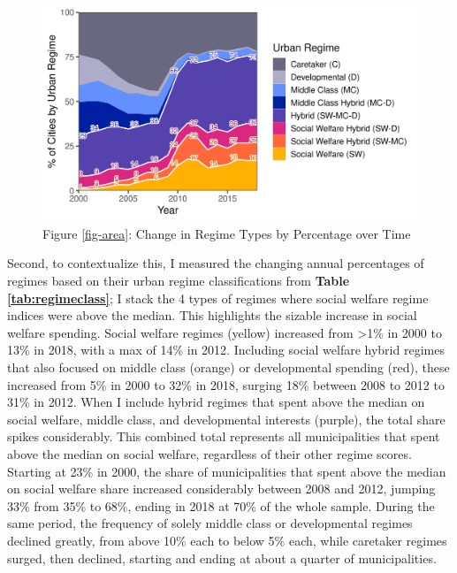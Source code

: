 \documentclass[preprint, 3p,
authoryear]{elsarticle} %
\begin{document}
\begin{figure}
\includegraphics[width=1\linewidth]{../viz/percent_area} \caption{Figure \ref{fig-area}\label{fig-area}: Change in Regime Types by Percentage over Time}\label{fig:area}
\end{figure}

\doublespacing

Second, to contextualize this, I measured the changing annual
percentages of regimes based on their urban regime classifications from
\textbf{Table \ref{tab:regimeclass}}; I stack the 4 types of regimes
where social welfare regime indices were above the median. This
highlights the sizable increase in social welfare spending. Social
welfare regimes (yellow) increased from \textgreater1\% in 2000 to 13\%
in 2018, with a max of 14\% in 2012. Including social welfare hybrid
regimes that also focused on middle class (orange) or developmental
spending (red), these increased from 5\% in 2000 to 32\% in 2018,
surging 18\% between 2008 to 2012 to 31\% in 2012. When I include hybrid
regimes that spent above the median on social welfare, middle class, and
developmental interests (purple), the total share spikes considerably.
This combined total represents all municipalities that spent above the
median on social welfare, regardless of their other regime scores.
Starting at 23\% in 2000, the share of municipalities that spent above
the median on social welfare share increased considerably between 2008
and 2012, jumping 33\% from 35\% to 68\%, ending in 2018 at 70\% of the
whole sample. During the same period, the frequency of solely middle
class or developmental regimes declined greatly, from above 10\% each to
below 5\% each, while caretaker regimes surged, then declined, starting
and ending at about a quarter of municipalities.
\end{document}
